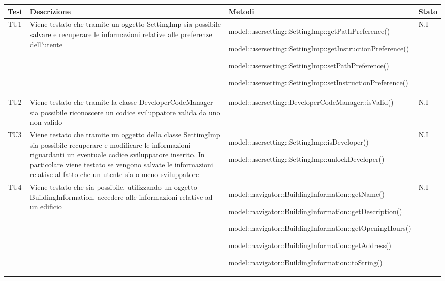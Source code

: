 \documentclass[../PianoDiQualifica.tex]{subfiles}
\begin{document}
\begin{appendices}
\begin{longtabu} to \textwidth {X[-0.5cm] X X X[-1cm]}
\toprule
\textbf{Test} & \textbf{Descrizione} & \textbf{Metodi} & \textbf{Stato}\\
\midrule
\endhead
{}
TU1 & Viene testato che tramite un oggetto SettingImp sia possibile salvare e recuperare le informazioni relative alle preferenze dell'utente & model::\-usersetting::\-SettingImp::\-getPathPreference() \par model::\-usersetting::\-SettingImp::\-getInstructionPreference() \par model::\-usersetting::\-SettingImp::\-setPathPreference() \par model::\-usersetting::\-SettingImp::\-setInstructionPreference() & N.I \\ 
\midrule 
TU2 & Viene testato che tramite la classe DeveloperCodeManager sia possibile riconoscere un codice sviluppatore valida da uno non valido & model::\-usersetting::\-DeveloperCodeManager::\-isValid() & N.I \\ 
\midrule 
TU3 & Viene testato che tramite un oggetto della classe SettimgImp sia possibile recuperare e modificare le informazioni riguardanti un eventuale codice sviluppatore inserito. In particolare viene testato se vengono salvate le informazioni relative al fatto che un utente sia o meno sviluppatore & model::\-usersetting::\-SettingImp::\-isDeveloper() \par model::\-usersetting::\-SettingImp::\-unlockDeveloper() & N.I \\ 
\midrule 
TU4 & Viene testato che sia possibile, utilizzando un oggetto BuildingInformation, accedere alle informazioni relative ad un edificio & model::\-navigator::\-BuildingInformation::\-getName() \par model::\-navigator::\-BuildingInformation::\-getDescription() \par model::\-navigator::\-BuildingInformation::\-getOpeningHours() \par model::\-navigator::\-BuildingInformation::\-getAddress() \par model::\-navigator::\-BuildingInformation::\-toString() & N.I \\ 
\midrule 

\end{longtabu}
\end{appendices}
\end{document}
